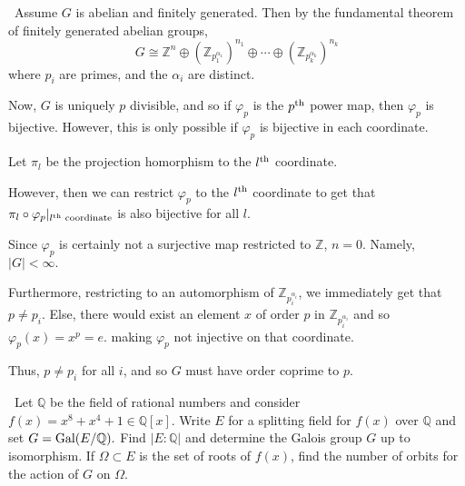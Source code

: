 \documentclass[12pt]{Qual}
\begin{document}
\begin{solution}$\,$
Assume $G$ is abelian and finitely generated. Then by the fundamental theorem of finitely generated abelian groups, $$G\cong\mathbb{Z}^n\oplus(\mathbb{Z}_{p_1^{\alpha_1}})^{n_1}\oplus\cdots\oplus(\mathbb{Z}_{p_k^{\alpha_k}})^{n_k}$$ where $p_i$ are primes, and the $\alpha_i$ are distinct.

Now, $G$ is uniquely $p$ divisible, and so if $\varphi_p$ is the $p^\text{th}$ power map, then $\varphi_p$ is bijective. However, this is only possible if $\varphi_p$ is bijective in each coordinate.

Let $\pi_l$ be the projection homorphism to the $l^\text{th}$ coordinate.

However, then we can restrict $\varphi_p$ to the $l^\text{th}$ coordinate to get that $\pi_l\circ\varphi_p|_{l^\text{th}\text{ coordinate}}$ is also bijective for all $l$.

Since $\varphi_p$ is certainly not a surjective map restricted to $\mathbb{Z}$, $n=0$. Namely, $|G|<\infty.$

Furthermore, restricting to an automorphism of $\mathbb{Z}_{p_i^{\alpha_i}}$, we immediately get that $p\not=p_i$. Else, there would exist an element $x$ of order $p$ in $\mathbb{Z}_{p_i^{\alpha_i}}$ and so $\varphi_p(x)=x^p=e$. making $\varphi_p$ not injective on that coordinate.

Thus, $p\not=p_i$ for all $i$, and so $G$ must have order coprime to $p$.
\end{solution}
\newpage



\begin{problem} $\,$
Let $\mathbb{Q}$ be the field of rational numbers and consider $f(x)=x^8+x^4+1\in\mathbb{Q}[x].$ Write $E$ for a splitting field for $f(x)$ over $\mathbb{Q}$ and set $G=\text{Gal}(E/\mathbb{Q}).$ Find $|E:\mathbb{Q}|$ and determine the Galois group $G$ up to isomorphism. If $\Omega\subset E$ is the set of roots of $f(x)$, find the number of orbits for the action of $G$ on $\Omega$.
\end{problem}
\end{document}
